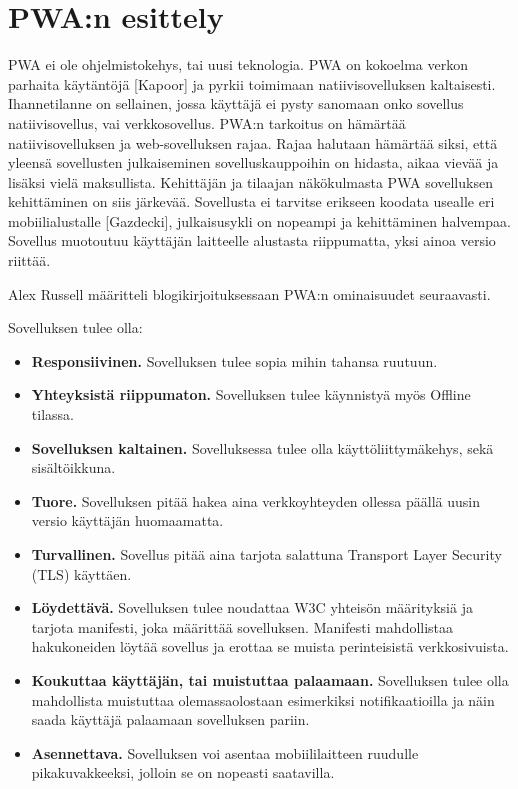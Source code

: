 \documentclass{tktltiki}
\begin{document}
\newpage
\section{PWA:n esittely}

PWA ei ole ohjelmistokehys, tai uusi teknologia. PWA on kokoelma verkon parhaita käytäntöjä [Kapoor] ja pyrkii toimimaan natiivisovelluksen kaltaisesti. Ihannetilanne on sellainen, jossa käyttäjä ei pysty sanomaan onko sovellus natiivisovellus, vai verkkosovellus. PWA:n tarkoitus on hämärtää natiivisovelluksen ja web-sovelluksen rajaa. Rajaa halutaan hämärtää siksi, että yleensä sovellusten julkaiseminen sovelluskauppoihin on hidasta, aikaa vievää ja lisäksi vielä maksullista. Kehittäjän ja tilaajan näkökulmasta PWA sovelluksen kehittäminen on siis järkevää. Sovellusta ei tarvitse erikseen koodata usealle eri mobiilialustalle [Gazdecki], julkaisusykli on nopeampi ja kehittäminen halvempaa. Sovellus muotoutuu käyttäjän laitteelle alustasta riippumatta, yksi ainoa versio riittää.

Alex Russell määritteli blogikirjoituksessaan PWA:n ominaisuudet seuraavasti. 

Sovelluksen tulee olla:
\begin{itemize}
  \item \textbf{Responsiivinen.} Sovelluksen tulee sopia mihin tahansa ruutuun.
  \item \textbf{Yhteyksistä riippumaton.} Sovelluksen tulee käynnistyä myös Offline tilassa.
  \item \textbf{Sovelluksen kaltainen.} Sovelluksessa tulee olla käyttöliittymäkehys, sekä sisältöikkuna.
  \item \textbf{Tuore.} Sovelluksen pitää hakea aina verkkoyhteyden ollessa päällä uusin versio käyttäjän huomaamatta.
  \item \textbf{Turvallinen.} Sovellus pitää aina tarjota salattuna Transport Layer Security (TLS) käyttäen.
  \item \textbf{Löydettävä.} Sovelluksen tulee noudattaa W3C yhteisön määrityksiä ja tarjota manifesti, joka määrittää sovelluksen. Manifesti mahdollistaa hakukoneiden löytää sovellus ja erottaa se muista perinteisistä verkkosivuista.
  \item \textbf{Koukuttaa käyttäjän, tai muistuttaa palaamaan.} Sovelluksen tulee olla mahdollista muistuttaa olemassaolostaan esimerkiksi notifikaatioilla ja näin saada käyttäjä palaamaan sovelluksen pariin.
  \item \textbf{Asennettava.} Sovelluksen voi asentaa mobiililaitteen ruudulle pikakuvakkeeksi, jolloin se on nopeasti saatavilla.
\end{itemize}
\end{document}
